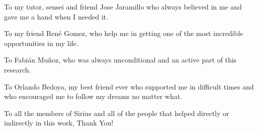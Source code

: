 \begin{dedication}
To my tutor, sensei and friend Jose Jaramillo who always believed in me and gave me a hand when I needed it.
\end{dedication}
\begin{dedication}
To my friend René Gomez, who help me in getting one of the most incredible opportunities in my life.
\end{dedication}
\begin{dedication}
To Fabián Muñoz, who was always unconditional and an active part of this research.
\end{dedication}

\begin{dedication}
To Orlando Bedoya, my best friend ever who supported me in difficult times and who encouraged me to follow my dreams no matter what. 
\end{dedication}

\begin{dedication}
To all the members of Sirius and all of the people that helped directly or indirectly in this work, Thank You!
\end{dedication}
